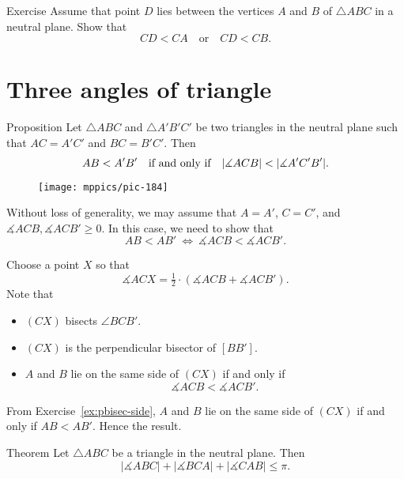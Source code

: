 \begin{thm}{Exercise}\label{ex:chev<side}
Assume that point $D$ lies between the vertices $A$ and $B$ of $\triangle ABC$ in a neutral plane.
Show that 
$$CD<CA
\quad
\text{or}
\quad
CD<CB.$$

\end{thm}

\section*{Three angles of triangle}

\begin{thm}{Proposition}\label{prop:angle-side}
Let $\triangle ABC$ and $\triangle A'B'C'$ be two triangles in the neutral plane
such that $AC=A'C'$ and $BC=B'C'$.
Then 
$$AB\z<A'B'
\quad
\text{if and only if}
\quad 
|\measuredangle ACB|<|\measuredangle A'C'B'|.$$

\end{thm}

\begin{wrapfigure}{o}{38mm}
\vskip-6mm
\centering
\texttt{[image: mppics/pic-184]}
\end{wrapfigure}

Without loss of generality, we may assume that $A=A'$, $C=C'$, and $\measuredangle ACB,\measuredangle ACB'\ge 0$.
In this case, we need to show that 
$$AB<AB'
\ 
\iff
\  
\measuredangle ACB<\measuredangle ACB'.$$

Choose a point $X$ so that 
$$\measuredangle ACX=\tfrac12\cdot(\measuredangle ACB+\measuredangle ACB').$$
Note that 
\begin{itemize}
\item $(CX)$ bisects $\angle BCB'$.
\item $(CX)$ is the perpendicular bisector of $[BB']$.
\item $A$ and $B$ lie on the same side of $(CX)$ if and only if $$\measuredangle ACB<\measuredangle ACB'.$$
\end{itemize}
From Exercise~\ref{ex:pbisec-side}, $A$ and $B$ lie on the same side of $(CX)$ if and only if $AB<AB'$.
Hence the result.
\qeds

\begin{thm}{Theorem}\label{thm:3sum-a}
Let $\triangle ABC$ be a triangle in the neutral plane.
Then 
$$|\measuredangle ABC|+|\measuredangle BCA|+|\measuredangle CAB|\le \pi.$$

\end{thm}


